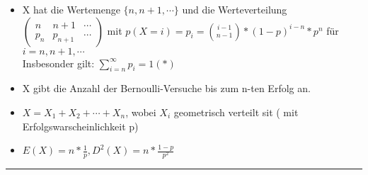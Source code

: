 \documentclass{../tudscript}
\begin{document}
  \begin{itemize}
  \item X hat die Wertemenge $\{n,n+1, \cdots\}$
    und die Werteverteilung
    $\begin{pmatrix}
      n & n+1 & \cdots \\
      p_n & p_{n+1} &\cdots
    \end{pmatrix}$
    mit $p(X= i)= p_i = \binom{i-1}{n-1}* (1-p)^{i-n} * p^n$ für $i = n,n+1,
    \cdots$\\
    Insbesonder gilt: $\sum_{i=n}^{\infty} p_i = 1 (*)$
  \item X gibt die Anzahl der Bernoulli-Versuche bis zum n-ten Erfolg an.
    \item $X = X_1 + X_2 + \cdots + X_n$, wobei $X_i$ geometrisch verteilt sit (
      mit Erfolgswarscheinlichkeit p)
    \item $E(X) = n * \frac{1}{p}, D^2(X) = n * \frac{1-p}{p^2} $
      
    \end{itemize}
    \rule{\textwidth}{.4pt}
\end{document}
